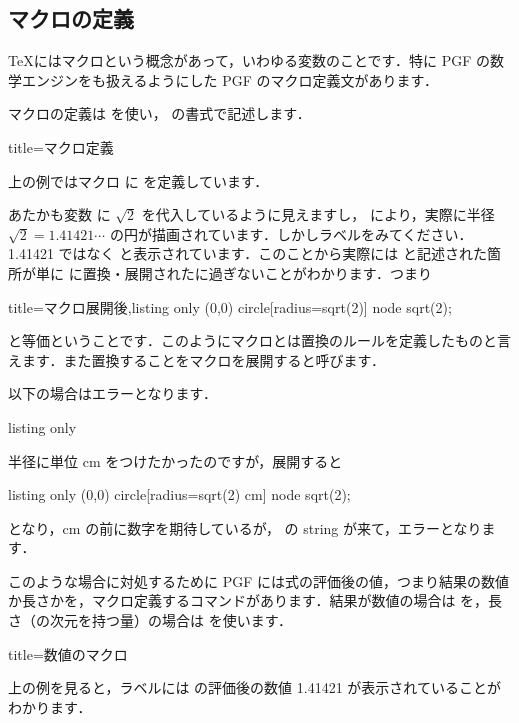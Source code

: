 \documentclass[../geometrymemo.tex]{subfiles}
\begin{document}
\subsection{マクロの定義}

\TeX{}にはマクロという概念があって，いわゆる変数のことです．特に PGF の数学エンジンをも扱えるようにした PGF のマクロ定義文があります．

マクロの定義は \lstinlineiv{\def} を使い， の書式で記述します．
\begin{tcblisting}{title=マクロ定義}
\end{tcblisting}
上の例ではマクロ \lstinlineiv{\r} に  を定義しています．%

あたかも変数 \lstinlineiv{\r} に \(\sqrt{2}\) を代入しているように見えますし，  により，実際に半径 \(\sqrt{2} = 1.41421\cdots\) の円が描画されています．しかしラベルをみてください．1.41421 ではなく  と表示されています．このことから実際には \lstinlineiv{\r} と記述された箇所が単に  に置換・展開されたに過ぎないことがわかります．つまり
\begin{tcblisting}{title=マクロ展開後,listing only}
    \draw (0,0) circle[radius=sqrt(2)] node {sqrt(2)}; %
\end{tcblisting}
と等価ということです．このようにマクロとは置換のルールを定義したものと言えます．また置換することをマクロを展開すると呼びます．

以下の場合はエラーとなります．
\begin{tcblisting}{listing only}
\end{tcblisting}
半径に単位 cm をつけたかったのですが，展開すると
\begin{tcblisting}{listing only}
    \draw (0,0) circle[radius=sqrt(2) cm] node {sqrt(2)}; %
\end{tcblisting}
となり，cm の前に数字を期待しているが，  の string が来て，エラーとなります． %

このような場合に対処するために PGF には式の評価後の値，つまり結果の数値か長さかを，マクロ定義するコマンドがあります．結果が数値の場合は \lstinlineiv{\pgfmathsetmacro} を，長さ（の次元を持つ量）の場合は \lstinlineiv{\pgfmathsetlengthmacro} を使います．
\begin{tcblisting}{title=数値のマクロ}
\end{tcblisting}
上の例を見ると，ラベルには  の評価後の数値 1.41421 が表示されていることがわかります． %
\end{document}
